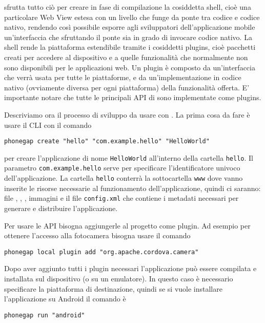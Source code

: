             \pg{} sfrutta tutto ciò per creare in fase di compilazione la
            cosiddetta shell, cioè una particolare
            Web View estesa con un livello che funge da ponte
            tra codice \js{} e codice nativo, rendendo così possibile esporre
            agli sviluppatori dell'applicazione mobile un'interfaccia \js{}
            che sfruttando il ponte sia in grado di invocare codice nativo.
            La shell rende la piattaforma \pg{} estendibile tramite i cosiddetti
            plugins, cioè pacchetti creati per accedere al dispositivo e a quelle
            funzionalità che normalmente non sono disponibili per le applicazioni
            web. Un plugin è composto da un'interfaccia \js{} che
            verrà usata per tutte le piattaforme, e da un'implementazione
            in codice nativo (ovviamente diversa per ogni piattaforma)
            della funzionalità offerta.
            E' importante notare che tutte le principali API di \pg{} sono
            implementate come plugins.

            Descriviamo ora il processo di sviluppo da usare con \pg{}.
            La prima cosa da fare è usare il CLI con il comando
    \begin{lstlisting}[language=MyBash]
  phonegap create "hello" "com.example.hello" "HelloWorld"
    \end{lstlisting}
            per creare l'applicazione di nome \verb|HelloWorld| all'interno della cartella
            \verb|hello|. Il parametro \verb|com.example.hello| serve per
            specificare l'identificatore univoco dell'applicazione.
            La cartella \verb|hello| conterrà la sottocartella \verb|www| dove
            vanno inserite le risorse necessarie al funzionamento dell'applicazione,
            quindi ci saranno: file \html{}, \css{}, \js{}, immagini e il file
            \verb|config.xml| che contiene i metadati necessari per generare e
            distribuire l'applicazione.

            Per usare le API bisogna aggiungerle al progetto come plugin. Ad
            esempio per ottenere l'accesso alla fotocamera bisogna usare il comando
    \begin{lstlisting}[language=MyBash]
  phonegap local plugin add "org.apache.cordova.camera"
    \end{lstlisting}

            Dopo aver aggiunto tutti i plugin necessari l'applicazione può
            essere compilata e installata sul dispositivo (o su un emulatore).
            In questo caso è necessario specificare la piattaforma di destinazione,
            quindi se si vuole installare l'applicazione su Android il comando è
    \begin{lstlisting}[language=MyBash]
  phonegap run "android"
    \end{lstlisting}

